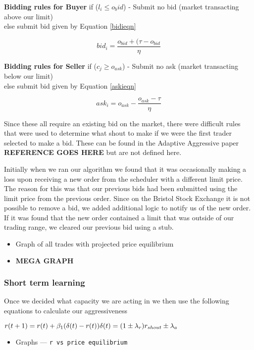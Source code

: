 \documentclass{acm_proc_article-sp}
\begin{document}
\textbf{Bidding rules for Buyer}
if ($l_i \leq o_bid$) - Submit no bid (market transacting above our limit)\\
else submit bid given by Equation \ref{bidieqn}

\begin{equation}
bid_i = \frac{o_{bid} + (\tau - o_{bid}}{\eta}
\label{bidieqn}
\end{equation}

\textbf{Bidding rules for Seller}
if ($c_j \geq o_{ask}$) - Submit no ask (market transacting below our limit)\\
else submit bid given by Equation \ref{askieqn}

\begin{equation}
ask_i = o_{ask} - \frac{o_{ask}-\tau}{\eta}
\label{askieqn}
\end{equation}

Since these all require an existing bid on the market, there were difficult
rules that were used to determine what shout to make if we were the first
trader selected to make a bid. These can be found in the Adaptive Aggressive
paper \textbf{REFERENCE GOES HERE}  but are not defined here.

Initially when we ran our algorithm we found that it was occasionally making a
loss upon receiving a new order from the scheduler with a different limit
price. The reason for this was that our previous bids had been submitted using
the limit price from the previous order. Since on the Bristol Stock Exchange it
is not possible to remove a bid, we added additional logic to notify us of the
new order. If it was found that the new order contained a limit that was
outside of our trading range, we cleared our previous bid using a stub.

\begin{itemize} \itemsep0pt
	\item Graph of all trades with projected price equilibrium
	\item \textbf{MEGA GRAPH}
\end{itemize}


\subsubsection{Short term learning} \label{sec:AA_short_term_learning}
Once we decided what capacity we are acting in we then use the following
equations to calculate our aggressiveness

$r(t+1) = r(t) + \beta_1(\delta(t) - r(t))\\\delta(t) = (1 \pm
\lambda_r)r_{shout} \pm \lambda_a$
\begin{itemize} \itemsep0pt
	\item Graphs --- \tt r \rm vs price equilibrium
\end{itemize}
\end{document}
